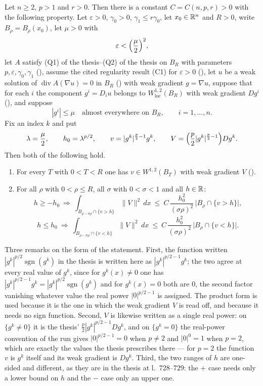 \begin{lemma}
Let $n\ge2$, $p>1$ and $r>0$.  Then there is a constant
$C=C(n,p,r)>0$ with the following property.  Let
$\varepsilon>0$, $\gamma_0>0$, $\gamma_1\le r\gamma_0$, let
$x_0\in\mathbb{R}^n$ and $R>0$, write $B_\rho=B_\rho(x_0)$, let $\mu>0$ with
\[
\varepsilon<\Bigl(\frac\mu2\Bigr)^{2},
\]
let $A$ satisfy (Q1) of the thesis--(Q2) of the thesis on $B_R$ with parameters
$p,\varepsilon,\gamma_0,\gamma_1$ (), assume the
cited regularity result (C1) for $\varepsilon>0$
(), let $u$ be a weak solution of
$\operatorname{div}A(\nabla u)=0$ in $B_R$ () with weak
gradient $g=\nabla u$, suppose that for each $i$ the component $g^i=D_iu$
belongs to $W^{1,2}_{\mathrm{loc}}(B_R)$ with weak gradient $Dg^i$
(), and suppose
\[
|g^i|\le\mu\quad\text{almost everywhere on }B_R,\qquad i=1,\dots,n .
\]
Fix an index $k$ and put
\[
\lambda=\frac\mu2,\qquad h_0=\lambda^{p/2},\qquad
v=|g^k|^{\frac p2-1}g^k,\qquad
V=\Bigl(\frac p2|g^k|^{\frac p2-1}\Bigr)Dg^k .
\]
Then both of the following hold.
\begin{enumerate}
\item For every $T$ with $0<T<R$ one has $v\in W^{1,2}(B_T)$ with weak gradient
  $V$ ().
\item For all $\rho$ with $0<\rho\le R$, all $\sigma$ with $0<\sigma<1$ and all
  $h\in\mathbb{R}$:
  \[
  h\ge-h_0\ \Longrightarrow\
  \int_{B_{\rho-\sigma\rho}\cap\{v>h\}}\|V\|^2\,dx
  \ \le\ C\,\frac{h_0^2}{(\sigma\rho)^2}\,\bigl|B_\rho\cap\{v>h\}\bigr| ,
  \]
  \[
  h\le h_0\ \Longrightarrow\
  \int_{B_{\rho-\sigma\rho}\cap\{v<h\}}\|V\|^2\,dx
  \ \le\ C\,\frac{h_0^2}{(\sigma\rho)^2}\,\bigl|B_\rho\cap\{v<h\}\bigr| .
  \]
\end{enumerate}

Three remarks on the form of the statement.  First, the function written
$|g^k|^{p/2}\operatorname{sgn}(g^k)$ in the thesis is written here as
$|g^k|^{p/2-1}g^k$; the two agree at every real value of $g^k$, since for
$g^k(x)\ne0$ one has $|g^k|^{p/2-1}g^k=|g^k|^{p/2}\operatorname{sgn}(g^k)$ and
for $g^k(x)=0$ both are $0$, the second factor vanishing whatever value the real
power $|0|^{p/2-1}$ is assigned.  The product form is used because it is the
one in which the weak gradient $V$ is read off, and because it needs no sign
function.  Second, $V$ is likewise written as a single real power: on
$\{g^k\ne0\}$ it is the thesis' $\tfrac p2|g^k|^{p/2-1}Dg^k$, and on
$\{g^k=0\}$ the real-power convention of the run gives
$|0|^{p/2-1}=0$ when $p\ne2$ and $|0|^{0}=1$ when $p=2$, which are exactly the
values the thesis prescribes there --- for $p=2$ the function $v$ is $g^k$
itself and its weak gradient is $Dg^k$.  Third, the two ranges of $h$ are
one-sided and different, as they are in the thesis at l.~728--729: the $+$ case
needs only a lower bound on $h$ and the $-$ case only an upper one.


\end{lemma}
